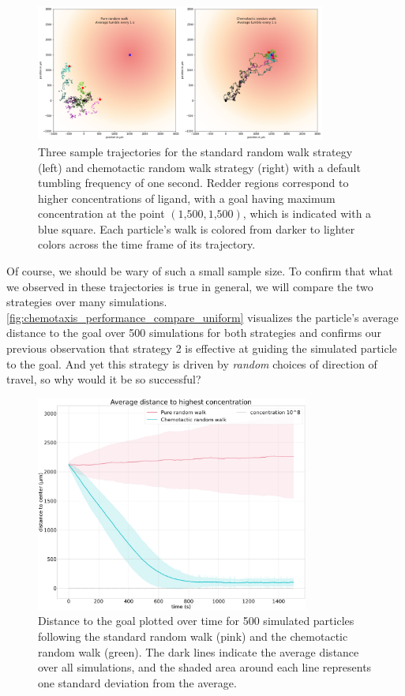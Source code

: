 \begin{figure}[h]
\centering
\mySfFamily
\includegraphics[width = 0.85\textwidth]{../images/chemotaxis_traj_compare_uniform.png}
\caption{Three sample trajectories for the standard random walk strategy (left) and chemotactic random walk strategy (right) with a default tumbling frequency of one second. Redder regions correspond to higher concentrations of ligand, with a goal having maximum concentration at the point $(\text{1,500}, \text{1,500})$, which is indicated with a blue square. Each particle's walk is colored from darker to lighter colors across the time frame of its trajectory.}
\label{fig:chemotaxis_traj_compare_uniform}
\end{figure}

Of course, we should be wary of such a small sample size. To confirm that what we observed in these trajectories is true in general, we will compare the two strategies over many simulations. \autoref{fig:chemotaxis_performance_compare_uniform} visualizes the particle's average distance to the goal over 500 simulations for both strategies and confirms our previous observation that strategy 2 is effective at guiding the simulated particle to the goal. And yet this strategy is driven by \textit{random} choices of direction of travel, so why would it be so successful?\\

\begin{figure}[h]
\centering
\mySfFamily
\includegraphics[width = 0.8\textwidth]{../images/chemotaxis_performance_compare_uniform.png}
\caption{Distance to the goal plotted over time for 500 simulated particles following the standard random walk (pink) and the chemotactic random walk (green). The dark lines indicate the average distance over all simulations, and the shaded area around each line represents one standard deviation from the average.}
\label{fig:chemotaxis_performance_compare_uniform}
\end{figure}

